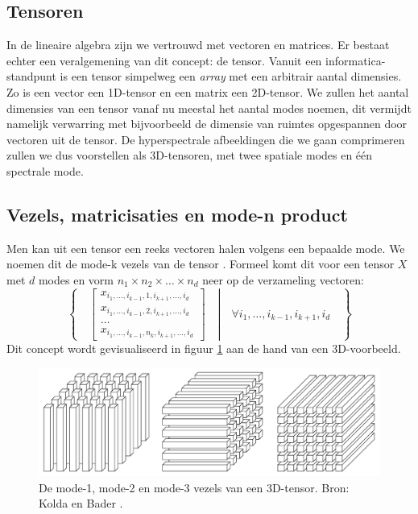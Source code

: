\subsection{Tensoren}

In de lineaire algebra zijn we vertrouwd met vectoren en matrices. Er bestaat echter een veralgemening van dit concept: de tensor. Vanuit een informatica-standpunt is een tensor simpelweg een \textit{array} met een arbitrair aantal dimensies. Zo is een vector een 1D-tensor en een matrix een 2D-tensor. We zullen het aantal dimensies van een tensor vanaf nu meestal het aantal modes noemen, dit vermijdt namelijk verwarring met bijvoorbeeld de dimensie van ruimtes opgespannen door vectoren uit de tensor. De hyperspectrale afbeeldingen die we gaan comprimeren zullen we dus voorstellen als 3D-tensoren, met twee spatiale modes en \'e\'en spectrale mode.

\subsection{Vezels, matricisaties en mode-n product}

Men kan uit een tensor een reeks vectoren halen volgens een bepaalde mode. We noemen dit de mode-k vezels van de tensor \cite{ref:kolda}. Formeel komt dit voor een tensor $X$ met $d$ modes en vorm $n_1 \times n_2 \times \dots \times n_d$ neer op de verzameling vectoren:
\[
\left\{
\quad
\left.
\begin{bmatrix}
x_{i_1, \dots, i_{k-1}, 1, i_{k+1}, \dots, i_d} \\
x_{i_1, \dots, i_{k-1}, 2, i_{k+1}, \dots, i_d} \\
\dots \\
x_{i_1, \dots, i_{k-1}, n_k, i_{k+1}, \dots, i_d}
\end{bmatrix}
\quad
\right\vert
\quad
\forall i_1, \dots, i_{k-1}, i_{k+1}, i_d
\quad
\right\}
\]
Dit concept wordt gevisualiseerd in figuur \ref{fig:fibers} aan de hand van een 3D-voorbeeld.

\begin{figure}[H]
  \centering
  \includegraphics[scale=0.2]{images/fibers.png}
  \caption{De mode-1, mode-2 en mode-3 vezels van een 3D-tensor. Bron: Kolda en Bader \cite{ref:kolda}.}
\label{fig:fibers}
\end{figure}

